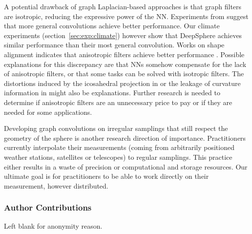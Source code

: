\documentclass{article} %
\newcommand{\todo}[1]{{\color[rgb]{.6,.1,.6}{#1}}}
\newcommand{\secref}[1]{section~\ref{sec:#1}}
\begin{document}
A potential drawback of graph Laplacian-based approaches is that graph filters are isotropic, reducing the expressive power of the NN.
Experiments from \citet{cohen2019gauge} suggest that more general convolutions achieve better performance.
Our climate experiments (\secref{exp:climate}) however show that DeepSphere achieves similar performance than their most general convolution.
Works on shape alignment indicates that anisotropic filters achieve better performance \todo{[Bronstein]}.
Possible explanations for this discrepancy are that NNs somehow compensate for the lack of anisotropic filters, or that some tasks can be solved with isotropic filters.
The distortions induced by the icosahedral projection in \citep{cohen2019gauge} or the leakage of curvature information in \todo{[Bronstein]} might also be explanations.
Further research is needed to determine if anisotropic filters are an unnecessary price to pay or if they are needed for some applications.

Developing graph convolutions on irregular samplings that still respect the geometry of the sphere is another research direction of importance.
Practitioners currently interpolate their measurements (coming from arbitrarily positioned weather stations, satellites or telescopes) to regular samplings.
This practice either results in a waste of precision or computational and storage resources.
Our ultimate goal is for practitioners to be able to work directly on their measurement, however distributed.



\newpage
\subsubsection*{Author Contributions}
Left blank for anonymity reason.
\end{document}
